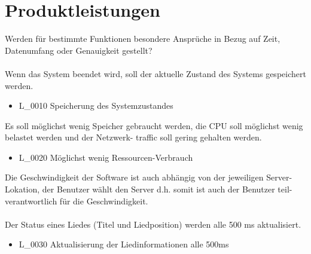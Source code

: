 \chapter{Produktleistungen}
Werden für bestimmte Funktionen besondere Ansprüche in Bezug auf Zeit, Datenumfang oder Genauigkeit gestellt?\ \\ \\
Wenn das System beendet wird, soll der aktuelle Zustand des Systems gespeichert werden.
\renewcommand{\labelitemi}{•}
\begin{itemize}
	\item L\_0010 Speicherung des Systemzustandes
\end{itemize}
Es soll möglichst wenig Speicher gebraucht werden, die CPU soll möglichst wenig belastet werden und der Netzwerk-
traffic soll gering gehalten werden.
\begin{itemize}
	\item L\_0020 Möglichst wenig Ressourcen-Verbrauch
\end{itemize}
Die Geschwindigkeit der Software ist auch abhängig von der jeweiligen Server-Lokation, der Benutzer wählt den
Server d.h. somit ist auch der Benutzer teil-verantwortlich für die Geschwindigkeit.\ \\ \\
Der Status eines Liedes (Titel und Liedposition) werden alle 500 ms aktualisiert.
\begin{itemize}
	\item L\_0030 Aktualisierung der Liedinformationen alle 500ms
\end{itemize}
